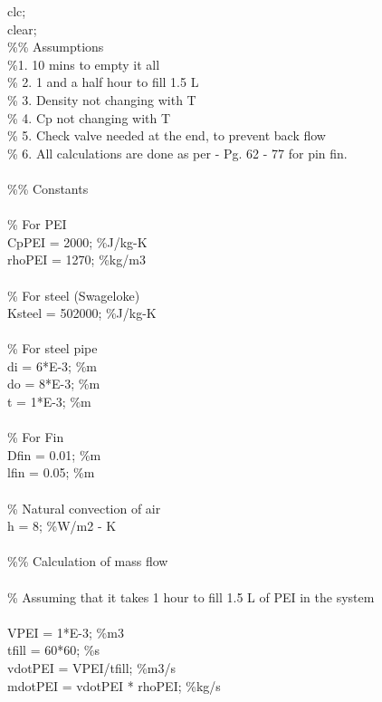 \begin{appendices}
{\selectfont
clc; \\
clear; \\

\noindent \%\% Assumptions \\

\noindent \%1. 10  mins to empty it all \\
\% 2. 1 and a half hour to fill 1.5 L \\
\% 3. Density not changing with T \\
\% 4. Cp not changing with T \\
\% 5. Check valve needed at the end, to prevent back flow \\
\% 6. All calculations are done as per - Pg. 62 - 77 for pin fin. \\
\\
\%\% Constants \\
\\
\% For PEI \\
CpPEI = 2000; \%J/kg-K \\
rhoPEI = 1270; \%kg/m3 \\
\\
\% For steel (Swageloke) \\
Ksteel = 502000; \%J/kg-K \\
\\
\% For steel pipe \\
di = 6*E-3; \%m  \\
do = 8*E-3; \%m \\
t = 1*E-3; \%m \\
\\
\% For Fin \\
Dfin = 0.01; \%m \\
lfin = 0.05; \%m \\
\\
\% Natural convection of air \\
h = 8; \%W/m2 - K \\
\\
\%\% Calculation of mass flow \\
\\
\% Assuming that it takes 1 hour to fill 1.5 L of PEI in the system \\
\\
VPEI = 1*E-3; \%m3 \\
tfill = 60*60; \%s \\ 
vdotPEI = VPEI/tfill; \%m3/s \\
mdotPEI = vdotPEI * rhoPEI; \%kg/s \\
\\
}
\end{appendices}
